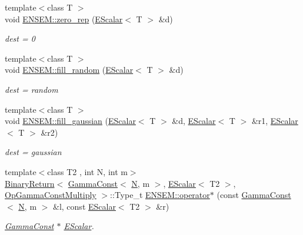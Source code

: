 \begin{DoxyCompactItemize}
{\footnotesize template$<$class T $>$ }\\void \mbox{\hyperlink{group__escalar_gacea96299b1b52d3a75cdb109c3b03b05}{E\+N\+S\+E\+M\+::zero\+\_\+rep}} (\mbox{\hyperlink{classENSEM_1_1EScalar}{E\+Scalar}}$<$ T $>$ \&d)
\begin{DoxyCompactList}\small\item\em dest = 0 \end{DoxyCompactList}\item 
{\footnotesize template$<$class T $>$ }\\void \mbox{\hyperlink{group__escalar_gab876765eed1c2ac8b1d1adcf0b0ba123}{E\+N\+S\+E\+M\+::fill\+\_\+random}} (\mbox{\hyperlink{classENSEM_1_1EScalar}{E\+Scalar}}$<$ T $>$ \&d)
\begin{DoxyCompactList}\small\item\em dest = random \end{DoxyCompactList}\item 
{\footnotesize template$<$class T $>$ }\\void \mbox{\hyperlink{group__escalar_ga3598759ad3e33b4008dd80a044cc75a8}{E\+N\+S\+E\+M\+::fill\+\_\+gaussian}} (\mbox{\hyperlink{classENSEM_1_1EScalar}{E\+Scalar}}$<$ T $>$ \&d, \mbox{\hyperlink{classENSEM_1_1EScalar}{E\+Scalar}}$<$ T $>$ \&r1, \mbox{\hyperlink{classENSEM_1_1EScalar}{E\+Scalar}}$<$ T $>$ \&r2)
\begin{DoxyCompactList}\small\item\em dest = gaussian \end{DoxyCompactList}\item 
{\footnotesize template$<$class T2 , int N, int m$>$ }\\\mbox{\hyperlink{structENSEM_1_1BinaryReturn}{Binary\+Return}}$<$ \mbox{\hyperlink{classENSEM_1_1GammaConst}{Gamma\+Const}}$<$ \mbox{\hyperlink{operator__name__util_8cc_a7722c8ecbb62d99aee7ce68b1752f337}{N}}, m $>$, \mbox{\hyperlink{classENSEM_1_1EScalar}{E\+Scalar}}$<$ T2 $>$, \mbox{\hyperlink{structENSEM_1_1OpGammaConstMultiply}{Op\+Gamma\+Const\+Multiply}} $>$\+::Type\+\_\+t \mbox{\hyperlink{group__escalar_gae8dabaf2e8ff409632f9943294b5a6b4}{E\+N\+S\+E\+M\+::operator$\ast$}} (const \mbox{\hyperlink{classENSEM_1_1GammaConst}{Gamma\+Const}}$<$ \mbox{\hyperlink{operator__name__util_8cc_a7722c8ecbb62d99aee7ce68b1752f337}{N}}, m $>$ \&l, const \mbox{\hyperlink{classENSEM_1_1EScalar}{E\+Scalar}}$<$ T2 $>$ \&r)
\begin{DoxyCompactList}\small\item\em \mbox{\hyperlink{classENSEM_1_1GammaConst}{Gamma\+Const}} $\ast$ \mbox{\hyperlink{classENSEM_1_1EScalar}{E\+Scalar}}. \end{DoxyCompactList}\item 

\end{DoxyCompactItemize}
